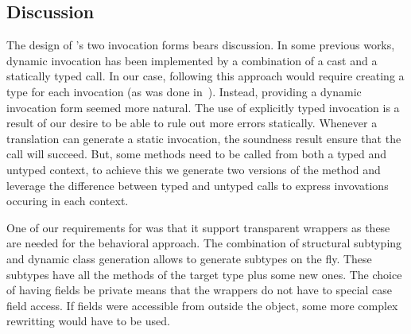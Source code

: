 \documentclass[USenglish]{tex/lipics-v2016}
\begin{document}
\subsection{Discussion}

The design of \kafka's two invocation forms bears discussion. In some
previous works, dynamic invocation has been implemented by a combination of
a cast and a statically typed call.  In our case, following this approach
would require creating a type for each invocation (as was done
in~\cite{popl10}). Instead, providing a dynamic invocation form seemed more
natural.  The use of explicitly typed invocation is a result of our desire
to be able to rule out more errors statically. Whenever a translation can
generate a static invocation, the soundness result ensure that the call will
succeed. But, some methods need to be called from both a typed and untyped
context, to achieve this we generate two versions of the method and leverage
the difference between typed and untyped calls to express invovations
occuring in each context.

One of our requirements for \kafka was that it support transparent wrappers
as these are needed for the behavioral approach. The combination of
structural subtyping and dynamic class generation allows to generate
subtypes on the fly. These subtypes have all the methods of the target type
plus some new ones. The choice of having fields be private means that the
wrappers do not have to special case field access. If fields were accessible
from outside the object, some more complex rewritting would have to be
used.
\end{document}
